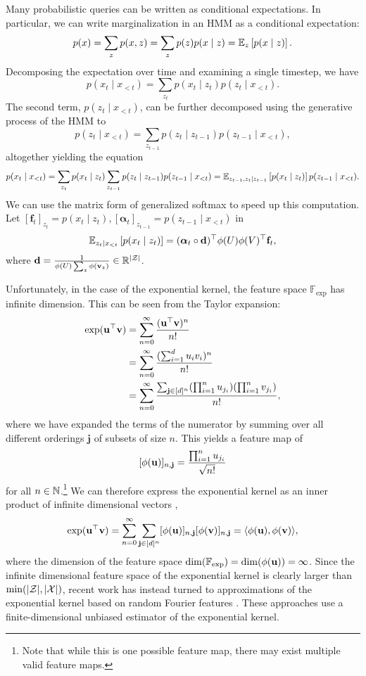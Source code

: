 \documentclass{article}
\begin{document}
Many probabilistic queries can be written as conditional expectations.
In particular, we can write marginalization in an HMM as a conditional expectation:
$$p(x) = \sum_z p(x,z) = \sum_z p(z)p(x \mid z) = \mathbb{E}_{z}\left[p(x \mid z)\right].$$
Decomposing the expectation over time and examining a single timestep, we have
$$p(x_t \mid x_{<t})
= \sum_{z_t}p(x_t\mid z_t)p(z_t \mid x_{<t}).
$$
The second term, $p(z_t \mid x_{<t})$,
can be further decomposed using the generative process of the HMM to
$$
 p(z_t \mid x_{<t}) = \sum_{z_{t-1}}p(z_t \mid z_{t-1})p(z_{t-1} \mid x_{<t}),
$$
altogether yielding the equation
$$
p(x_t \mid x_{<t})
= \sum_{z_t} p(x_t \mid z_t)\sum_{z_{t-1}}p(z_t \mid z_{t-1})p(z_{t-1} \mid x_{<t})
= \mathbb{E}_{z_{t-1},z_t\mid z_{t-1}}\left[p(x_t \mid z_t)\right]p(z_{t-1}\mid x_{<t}).
$$
We can use the matrix form of generalized softmax to speed up this computation.
Let $[\mathbf{f}_t]_{z_t} = p(x_t\mid z_t), [\bm\alpha_t]_{z_{t-1}} = p(z_{t-1}\mid x_{<t})$ in
$$\mathbb{E}_{z_t\mid x_{<t}}\left[p(x_t\mid z_t)\right]=(\bm\alpha_t\circ \mathbf{d})^\top\phi(U)\phi(V)^\top\mathbf{f}_t,$$
where $\mathbf{d} = \frac{1}{\phi(U)\sum_z\phi(\mathbf{v}_z)}\in\mathbb{R}^{|\mathcal{Z}|}$.

Unfortunately, in the case of the exponential kernel, the feature space $\mathbb{F}_{\exp}$
has infinite dimension.
This can be seen from the Taylor expansion:
\begin{align*}
\exp(\mathbf{u}^\top \mathbf{v})
&= \sum_{n=0}^\infty \frac{(\mathbf{u}^\top \mathbf{v})^n}{n!}\\
&= \sum_{n=0}^\infty \frac{(\sum_{i=1}^du_iv_i)^n}{n!}\\
&= \sum_{n=0}^\infty \frac{\sum_{\mathbf{j} \in [d]^n}(\prod_{i=1}^n u_{j_i})(\prod_{i=1}^n v_{j_i})}{n!},
\end{align*}
where we have expanded the terms of the numerator by summing over all different orderings
$\mathbf{j}$ of subsets of size $n$.
This yields a feature map of 
$$[\phi(\mathbf{u})]_{n,\mathbf{j}} = \frac{\prod_{i=1}^n u_{j_i}}{\sqrt{n!}}$$
for all $n\in\mathbb{N}$.\footnote{
Note that while this is one possible feature map, there may exist
multiple valid feature maps.
}
We can therefore express the exponential kernel as an inner product of
infinite dimensional vectors \citep{cotter2011gausskernel},
$$\exp(\mathbf{u}^\top\mathbf{v}) 
= \sum_{n=0}^\infty\sum_{\mathbf{j}\in[d]^n}[\phi(\mathbf{u})]_{n,\mathbf{j}}[\phi(\mathbf{v})]_{n,\mathbf{j}}
= \langle \phi(\mathbf{u}), \phi(\mathbf{v}) \rangle,
$$
where the dimension of the feature space $\dim(\mathbb{F}_{\exp}) = \dim(\phi(\mathbf{u})) = \infty$.
Since the infinite dimensional feature space of the exponential kernel is clearly larger than
$\min(|\mathcal{Z}|,|\mathcal{X}|)$, recent work has instead turned to approximations of the exponential kernel
based on random Fourier features
\citep{rawat2019sampledsoftmax,choromanski2020performer,peng2021rfa}.
These approaches use a finite-dimensional unbiased estimator of the exponential kernel.
\end{document}
